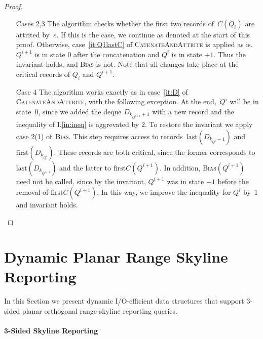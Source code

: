 \documentclass[]{article}
\newcommand{\first}{\text{first}}
\newcommand{\last}{\text{last}}
\newcommand{\iref}[1]{I.\ref{#1}}
\begin{document}
\begin{fullenv}
\begin{proof}
\begin{itemize}
    \item[Cases 2,3] {The algorithm checks whether the first two records
        of~$C(Q_i)$ are attrited by~$e$. If this is the case, we continue as
        denoted at the start of this proof. Otherwise, case~\ref{it:Q1lastC} of
        \textsc{CatenateAndAttrite} is applied as is. $Q^{i+1}$ is in state $0$
        after the concatenation and $Q^i$ is in state $+1$. Thus the invariant
        holds, and \textsc{Bias} is not. Note that all changes take place at the
        critical records of $Q_i$ and $Q^{i+1}$.}

    \item[Case 4] {The algorithm works exactly as in case~\ref{it:D} of
        \textsc{CatenateAndAttrite}, with the following exception. At the
        end,~$Q^i$ will be in state~$0$, since we added the deque
        $D_{k_{Q^{i+1}}+1}$ with a new record and the inequality of
        \iref{in:ineq} is aggrevated by $2$. To restore the invariant we apply
        case 2(1) of~\textsc{Bias}. This step requires access to records~$\last
        (D_{k_{Q^i}-1})$ and $\first (D_{k_{Q^i}})$. These records are both
        critical, since the former corresponds to $\last (D_{k_{Q^{i+1}}})$ and
        the latter to $\first C(Q^{i+1})$. In addition, \textsc{Bias}$(Q^{i+1})$
        need not be called, since by the invariant, $Q^{i+1}$ was in state $+1$
      before the removal of $\first C(Q^{i+1})$. In this way, we improve the
    inequality for $Q^i$ by~$1$ and invariant holds.}
  \end{itemize}
\end{proof}
\end{fullenv}

\section{Dynamic Planar Range Skyline Reporting} \label{sec:skyline}


In this Section we present dynamic I/O-efficient data structures that support
3-sided planar orthogonal range skyline reporting queries.

\paragraph{3-Sided Skyline Reporting}
\end{document}
